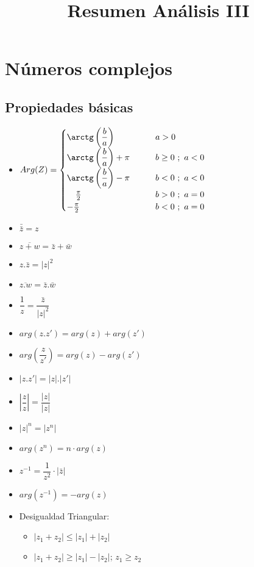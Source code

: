 \documentclass[12pt,a4paper]{article}
\title{Resumen Análisis III}
\author{}
\date{}
\begin{document}
\maketitle

\section{Números complejos}

\subsection*{Propiedades básicas}

\begin{itemize}
    \item $Arg(Z)=\begin{cases} \arctg \left( \dfrac{b}{a} \right) &\qquad a>0  \\ \arctg \left( \dfrac{b}{a} \right) + \pi &\qquad b \geq 0 \ ; \ a<0 \\ \arctg \left( \dfrac{b}{a} \right) - \pi &\qquad b < 0 \ ; \ a<0 \\ \hspace{3.5mm} \frac{\pi}{2} &\qquad b>0 \ ; \ a=0 \\ -\frac{\pi}{2} &\qquad b<0 \ ; \ a=0  \end{cases}$
    \item $\bar{\bar{z}} = z$
    \item $\overline{z+w}= \bar{z}+\bar{w}$
    \item $z.\bar{z}=|z|^2$
    \item $\overline{z.w}=\bar{z}.\bar{w}$
    \item $\dfrac{1}{z}=\dfrac{\bar{z}}{|z|^2}$
    \item $arg(z.z')=arg(z)+arg(z')$
    \item $arg(\dfrac{z}{z'})=arg(z)-arg(z')$
    \item $|z.z'|=|z|.|z'|$
    \item $|\dfrac{z}{z}|=\dfrac{|z|}{|z|}$
    \item $|z|^n=|z^n|$
    \item $arg(z^n)=n\cdot arg(z)$
    \item $z^{-1}=\dfrac{1}{z^2}\cdot|\bar{z}|$
    \item $arg(z^{-1}) = -arg(z)$
    \item Desigualdad Triangular:
    \begin{itemize}
        \item $|z_1 + z_2| \leq |z_1|+|z_2|$
        \item $|z_1 + z_2| \geq |z_1|-|z_2|$; $z_1 \geq z_2$
    \end{itemize}
\end{itemize}   
\end{document}
